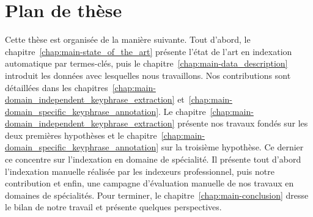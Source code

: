   \section{Plan de thèse}
  \label{sec:main-introduction-outline}
    Cette thèse est organisée de la manière suivante. Tout d'abord, le
    chapitre~\ref{chap:main-state_of_the_art} présente l'état de l'art en
    indexation automatique par termes-clés, puis le
    chapitre~\ref{chap:main-data_description} introduit les données avec
    lesquelles nous travaillons. Nos contributions sont détaillées dans les
    chapitres~\ref{chap:main-domain_independent_keyphrase_extraction}
    et~\ref{chap:main-domain_specific_keyphrase_annotation}. Le
    chapitre~\ref{chap:main-domain_independent_keyphrase_extraction} présente
    nos travaux fondés sur les deux premières hypothèses et le
    chapitre~\ref{chap:main-domain_specific_keyphrase_annotation} sur la
    troisième hypothèse. Ce dernier ce concentre sur l'indexation en domaine de
    spécialité. Il présente tout d'abord l'indexation manuelle réalisée par les
    indexeurs professionnel, puis notre contribution et enfin, une campagne
    d'évaluation manuelle de nos travaux en domaines de spécialités. Pour
    terminer, le chapitre~\ref{chap:main-conclusion} dresse le bilan de notre
    travail et présente quelques perspectives.

